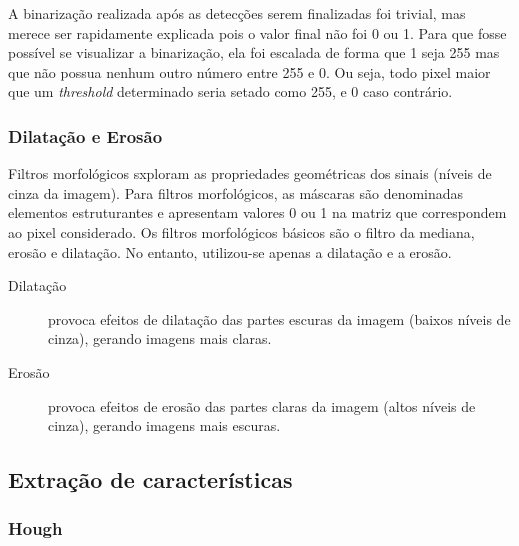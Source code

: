 \documentclass[10pt,twocolumn,letterpaper]{article}
\begin{document}
	A binarização realizada após as detecções serem finalizadas foi trivial, mas merece
ser rapidamente explicada pois o valor final não foi 0 ou 1. Para que fosse possível se
visualizar a binarização, ela foi escalada de forma que 1 seja 255 mas que não possua
nenhum outro número entre 255 e 0. Ou seja, todo pixel maior que um \emph{threshold}
determinado seria setado como 255, e 0 caso contrário.


\subsubsection{Dilatação e Erosão{\footnotesize \cite{filtros-morfologicos}}}

	Filtros morfológicos sxploram as propriedades geométricas dos sinais (níveis de cinza
da imagem). Para filtros morfológicos, as máscaras são denominadas elementos
estruturantes e apresentam valores 0 ou 1 na matriz que correspondem ao pixel considerado.
Os filtros morfológicos básicos são o filtro da mediana, erosão e dilatação. No entanto,
utilizou-se apenas a dilatação e a erosão.

\begin{description}
\item [Dilatação] provoca efeitos de dilatação das partes escuras da imagem (baixos níveis
de cinza), gerando imagens mais claras.
\item [Erosão] provoca efeitos de erosão das partes claras da imagem (altos níveis de
cinza), gerando imagens mais escuras.
\end{description}


\subsection{Extração de características}

\subsubsection{Hough}
\end{document}
